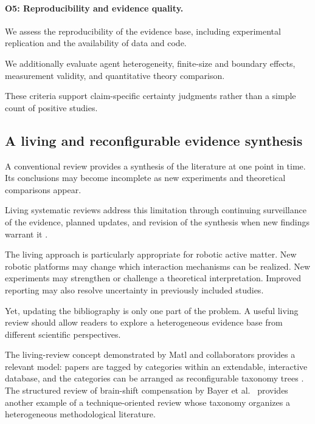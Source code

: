 \paragraph*{O5: Reproducibility and evidence quality.}

We assess the reproducibility
of the evidence base,
including experimental
replication and
the availability
of data and code.

We additionally
evaluate agent
heterogeneity,
finite-size and
boundary effects,
measurement validity,
and quantitative
theory comparison.

These criteria
support claim-specific
certainty judgments
rather than
a simple
count of
positive studies.

\subsection{A living and reconfigurable evidence synthesis}
\label{sec:introduction-living}

A conventional review provides a synthesis
of the literature at one point in time.
Its conclusions may become incomplete
as new experiments and theoretical
comparisons appear.

Living systematic reviews
address this limitation
through continuing surveillance
of the evidence,
planned updates,
and revision of
the synthesis
when new findings
warrant it
\cite{Elliott2014living,Elliott2017living}.

The living approach
is particularly
appropriate for
robotic active matter.
New robotic
platforms may
change which
interaction mechanisms
can be realized.
New experiments
may strengthen
or challenge
a theoretical
interpretation.
Improved reporting
may also resolve
uncertainty in
previously included
studies.

Yet, updating
the bibliography
is only one
part of
the problem.
A useful
living review
should allow
readers to
explore a
heterogeneous
evidence base
from different
scientific perspectives.

The living-review
concept demonstrated
by Matl and
collaborators
provides a
relevant model:
papers are
tagged by
categories within
an extendable,
interactive
database, and
the categories
can be arranged
as reconfigurable
taxonomy trees
\cite{Matl2017vascular}.
The structured
review of
brain-shift
compensation
by Bayer
et al.\
\cite{Bayer2017brainshift}
provides another
example of a
technique-oriented
review whose
taxonomy organizes
a heterogeneous
methodological
literature.

